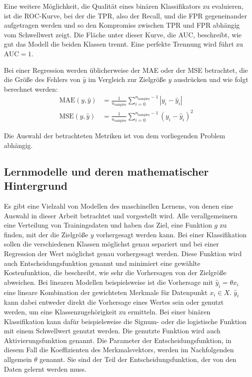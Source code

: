 	Eine weitere Möglichkeit, die Qualität eines binären Klassifikators zu evaluieren, ist die \ac{ROC}-Kurve, bei der die \ac{TPR}, also der Recall, und die \ac{FPR} gegeneinander aufgetragen werden und so den Kompromiss zwischen \ac{TPR} und \ac{FPR} abhängig vom Schwellwert zeigt. Die Fläche unter dieser Kurve, die \ac{AUC}, beschreibt, wie gut das Modell die beiden Klassen trennt. Eine perfekte Trennung wird führt zu $\text{AUC} = 1$.
	
	Bei einer Regression werden üblicherweise der \ac{MAE} oder der \ac{MSE} betrachtet, die die Größe des Fehlers von $\hat{y}$ im Vergleich zur Zielgröße $y$ ausdrücken und wie folgt berechnet werden:
	\begin{align*}
		\text{MAE}(y, \hat{y}) &= \frac{1}{n_{\text{samples}}} \sum_{i=0}^{n_{\text{samples}}-1} \left| y_i - \hat{y}_i \right| \\
		\text{MSE}(y, \hat{y}) &= \frac{1}{n_\text{samples}} \sum_{i=0}^{n_\text{samples} - 1} (y_i - \hat{y}_i)^2		
	\end{align*}
	
	Die Auswahl der betrachteten Metriken ist von dem vorliegenden Problem abhängig.

	\subsection{Lernmodelle und deren mathematischer Hintergrund}
	
		Es gibt eine Vielzahl von Modellen des maschinellen Lernens, von denen eine Auswahl in dieser Arbeit betrachtet und vorgestellt wird. Alle verallgemeinern eine Verteilung von Trainingsdaten und haben das Ziel, eine Funktion $g$ zu finden, mit der die Zielgröße $y$ vorhergesagt werden kann. Bei einer Klassifikation sollen die verschiedenen Klassen möglichst genau separiert und bei einer Regression der Wert möglichst genau vorhergesagt werden. Diese Funktion wird auch Entscheidungsfunktion genannt und minimiert eine gewählte Kostenfunktion, die beschreibt, wie sehr die Vorhersagen von der Zielgröße abweichen. Bei linearen Modellen beispielsweise ist die Vorhersage mit $\hat{y}_i = \theta x_i$ eine lineare Kombination der gewichteten Merkmale für Datenpunkt $x_i \in X$. $\hat{y}_i$ kann dabei entweder direkt die Vorhersage eines Wertes sein oder genutzt werden, um eine Klassenzugehörigkeit zu ermitteln. Bei einer binären Klassifikation kann dafür beispielsweise die Signum- oder die logistische Funktion mit einem Schwellwert genutzt werden. Die genutzte Funktion wird auch Aktivierungsfunktion genannt. Die Parameter der Entscheidungsfunktion, in diesem Fall die Koeffizienten des Merkmalsvektors, werden im Nachfolgenden allgemein $\theta$ genannt. Sie sind der Teil der Entscheidungsfunktion, der von den Daten gelernt werden muss.
		
